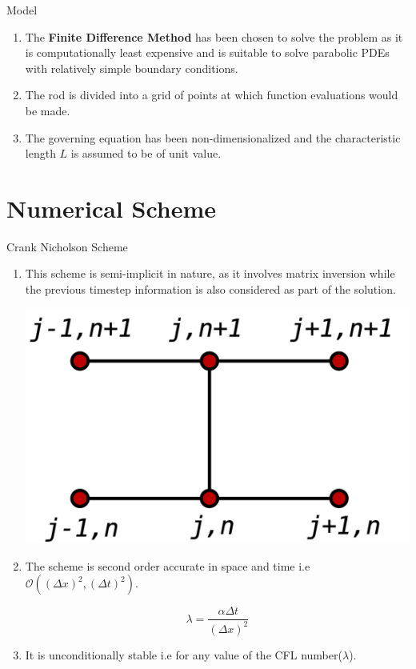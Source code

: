 \documentclass[10pt,compress]{beamer}
\begin{document}
\begin{frame}{Model}
\begin{enumerate}
\item The \textbf{Finite Difference Method} has been chosen to solve the problem as it is computationally least expensive and is suitable to solve parabolic PDEs with relatively simple boundary conditions.
\item The rod is divided into a grid of points at which function evaluations would be made.
\item The governing equation has been non-dimensionalized and the characteristic length $L$ is assumed to be of unit value.
\end{enumerate}
\end{frame}

\section{Numerical Scheme}

\begin{frame}{Crank Nicholson Scheme}
\begin{enumerate}
\item This scheme is semi-implicit in nature, as it involves matrix inversion while the previous timestep information is also considered as part of the solution.
\begin{center}
	\includegraphics[scale=0.10]{stencil.png}
\end{center}
\item The scheme is second order accurate in space and time i.e $\mathcal{O}((\Delta x)^{2},(\Delta t)^{2})$.
\begin{center}
\begin{equation} \label{cfl}
\lambda = \frac{\alpha \Delta t}{(\Delta x)^{2}}
\end{equation}
\end{center}
\item It is unconditionally stable i.e for any value of the CFL number($\lambda$).
\end{enumerate}	
\end{frame}
\end{document}
